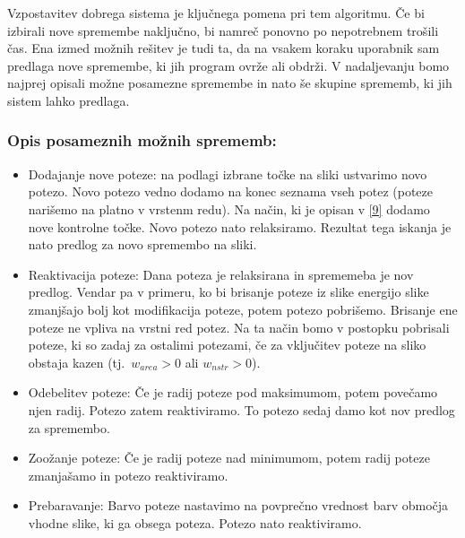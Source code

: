 Vzpostavitev dobrega sistema je ključnega pomena pri tem algoritmu. Če bi izbirali nove spremembe naključno, bi namreč ponovno po nepotrebnem trošili čas. Ena izmed možnih rešitev je tudi ta, da na vsakem koraku uporabnik sam predlaga nove spremembe, ki jih program ovrže ali obdrži. V nadaljevanju bomo najprej opisali možne posamezne spremembe in nato še skupine sprememb, ki jih sistem lahko predlaga.
%
\subsubsection{Opis posameznih možnih sprememb:}
%
\begin{itemize}
  \item Dodajanje nove poteze: na podlagi izbrane točke na sliki ustvarimo novo potezo. Novo potezo vedno dodamo na konec seznama vseh potez (poteze narišemo na platno v vrstenm redu). Na način, ki je opisan v \ref{9} dodamo nove kontrolne točke. Novo potezo nato relaksiramo. Rezultat tega iskanja je nato predlog za novo spremembo na sliki.
  \item Reaktivacija poteze: Dana poteza je relaksirana in sprememeba je nov predlog. Vendar pa v primeru, ko bi brisanje poteze iz slike energijo slike zmanjšajo bolj kot modifikacija poteze, potem potezo pobrišemo. Brisanje ene poteze ne vpliva na vrstni red potez. Na ta način bomo v postopku pobrisali poteze, ki so zadaj za ostalimi potezami, če za vključitev poteze na sliko obstaja kazen (tj.\ $w_{area} > 0$ ali $w_{nstr} > 0$).
  \item Odebelitev poteze: Če je radij poteze pod maksimumom, potem povečamo njen radij. Potezo zatem reaktiviramo. To potezo sedaj damo kot nov predlog za spremembo.
  \item Zoožanje poteze: Če je radij poteze nad minimumom, potem radij poteze zmanjašamo in potezo reaktiviramo.
  \item Prebaravanje: Barvo poteze nastavimo na povprečno vrednost barv območja vhodne slike, ki ga obsega poteza. Potezo nato reaktiviramo.
\end{itemize}
%

